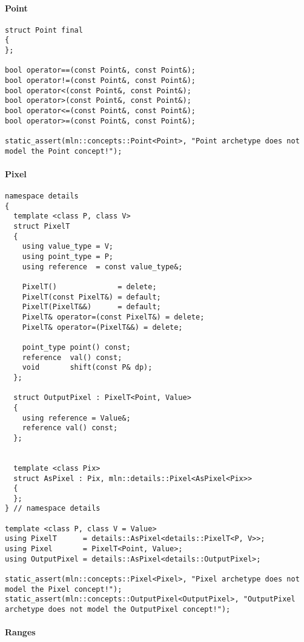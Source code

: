 \paragraph{Point}

\begin{verbatim}
struct Point final
{
};

bool operator==(const Point&, const Point&);
bool operator!=(const Point&, const Point&);
bool operator<(const Point&, const Point&);
bool operator>(const Point&, const Point&);
bool operator<=(const Point&, const Point&);
bool operator>=(const Point&, const Point&);

static_assert(mln::concepts::Point<Point>, "Point archetype does not model the Point concept!");
\end{verbatim}


\paragraph{Pixel}

\begin{verbatim}
namespace details
{
  template <class P, class V>
  struct PixelT
  {
    using value_type = V;
    using point_type = P;
    using reference  = const value_type&;

    PixelT()              = delete;
    PixelT(const PixelT&) = default;
    PixelT(PixelT&&)      = default;
    PixelT& operator=(const PixelT&) = delete;
    PixelT& operator=(PixelT&&) = delete;

    point_type point() const;
    reference  val() const;
    void       shift(const P& dp);
  };

  struct OutputPixel : PixelT<Point, Value>
  {
    using reference = Value&;
    reference val() const;
  };


  template <class Pix>
  struct AsPixel : Pix, mln::details::Pixel<AsPixel<Pix>>
  {
  };
} // namespace details

template <class P, class V = Value>
using PixelT      = details::AsPixel<details::PixelT<P, V>>;
using Pixel       = PixelT<Point, Value>;
using OutputPixel = details::AsPixel<details::OutputPixel>;

static_assert(mln::concepts::Pixel<Pixel>, "Pixel archetype does not model the Pixel concept!");
static_assert(mln::concepts::OutputPixel<OutputPixel>, "OutputPixel archetype does not model the OutputPixel concept!");
\end{verbatim}


\paragraph{Ranges}

